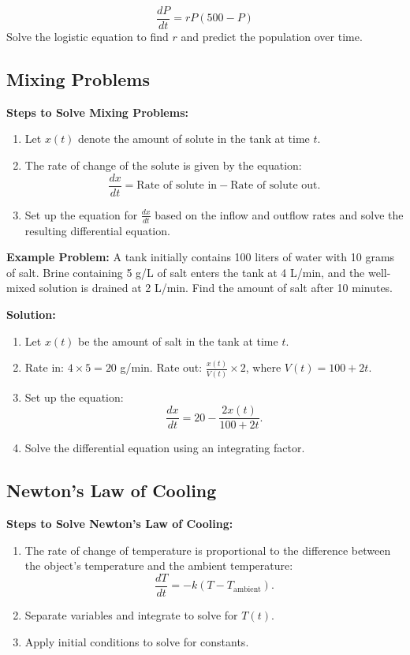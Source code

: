 \documentclass[10pt]{article}
\begin{document}
\[
\frac{dP}{dt} = r P (500 - P)
\]
Solve the logistic equation to find \( r \) and predict the population over time.

\subsection*{Mixing Problems}
\textbf{Steps to Solve Mixing Problems:}
\begin{enumerate}
    \item Let \( x(t) \) denote the amount of solute in the tank at time \( t \).
    \item The rate of change of the solute is given by the equation:
    \[
    \frac{dx}{dt} = \text{Rate of solute in} - \text{Rate of solute out}.
    \]
    \item Set up the equation for \( \frac{dx}{dt} \) based on the inflow and outflow rates and solve the resulting differential equation.
\end{enumerate}

\textbf{Example Problem:} A tank initially contains 100 liters of water with 10 grams of salt. Brine containing 5 g/L of salt enters the tank at 4 L/min, and the well-mixed solution is drained at 2 L/min. Find the amount of salt after 10 minutes.

\textbf{Solution:}
\begin{enumerate}
    \item Let \( x(t) \) be the amount of salt in the tank at time \( t \).
    \item Rate in: \( 4 \times 5 = 20 \) g/min. Rate out: \( \frac{x(t)}{V(t)} \times 2 \), where \( V(t) = 100 + 2t \).
    \item Set up the equation:
    \[
    \frac{dx}{dt} = 20 - \frac{2x(t)}{100 + 2t}.
    \]
    \item Solve the differential equation using an integrating factor.
\end{enumerate}

\subsection*{Newton’s Law of Cooling}
\textbf{Steps to Solve Newton’s Law of Cooling:}
\begin{enumerate}
    \item The rate of change of temperature is proportional to the difference between the object’s temperature and the ambient temperature:
    \[
    \frac{dT}{dt} = -k(T - T_{\text{ambient}}).
    \]
    \item Separate variables and integrate to solve for \( T(t) \).
    \item Apply initial conditions to solve for constants.
\end{enumerate}
\end{document}
